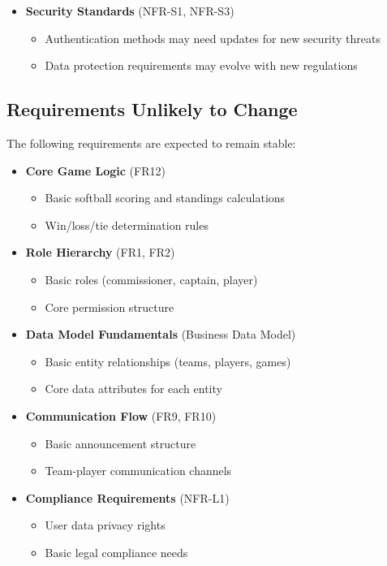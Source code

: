 \documentclass[12pt, titlepage]{article}
\begin{document}
\begin{itemize}
    \item \textbf{Security Standards} (NFR-S1, NFR-S3)
    \begin{itemize}
        \item Authentication methods may need updates for new security threats
        \item Data protection requirements may evolve with new regulations
    \end{itemize}
\end{itemize}

\subsection{Requirements Unlikely to Change}
The following requirements are expected to remain stable:

\begin{itemize}
    \item \textbf{Core Game Logic} (FR12)
    \begin{itemize}
        \item Basic softball scoring and standings calculations
        \item Win/loss/tie determination rules
    \end{itemize}

    \item \textbf{Role Hierarchy} (FR1, FR2)
    \begin{itemize}
        \item Basic roles (commissioner, captain, player)
        \item Core permission structure
    \end{itemize}

    \item \textbf{Data Model Fundamentals} (Business Data Model)
    \begin{itemize}
        \item Basic entity relationships (teams, players, games)
        \item Core data attributes for each entity
    \end{itemize}

    \item \textbf{Communication Flow} (FR9, FR10)
    \begin{itemize}
        \item Basic announcement structure
        \item Team-player communication channels
    \end{itemize}

    \item \textbf{Compliance Requirements} (NFR-L1)
    \begin{itemize}
        \item User data privacy rights
        \item Basic legal compliance needs
    \end{itemize}
\end{itemize}
\end{document}

